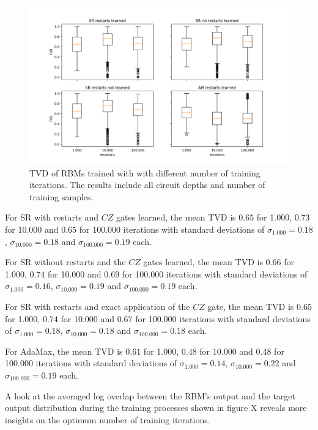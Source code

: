 \begin{figure}[H]
    \centering
    \includegraphics[width=\textwidth]{figures/iterations.png}
    \caption[Influence of Number of Training iterations.]{TVD of RBMs trained with 
    with different number of training iterations. The results include all circuit depths 
    and number of training samples.}
    \label{fig:iterations}
\end{figure}

For SR with restarts and $CZ$ gates learned, the mean TVD is $0.65$ for 1.000, $0.73$ for 10.000 and $0.65$ for 100.000 iterations 
with standard deviations of $\sigma_{1.000}=0.18$, $\sigma_{10.000}=0.18$ and $\sigma_{100.000}=0.19$
each. 

For SR without restarts and the $CZ$ gates learned, the mean TVD is $0.66$ for 1.000, $0.74$ for 10.000 and $0.69$ for 100.000 iterations 
with standard deviations of $\sigma_{1.000}=0.16$, $\sigma_{10.000}=0.19$ and $\sigma_{100.000}=0.19$
each. 

For SR with restarts and exact application of the $CZ$ gate, the mean TVD is $0.65$ for 1.000, $0.74$ for 10.000 and $0.67$ for 100.000 iterations 
with standard deviations of $\sigma_{1.000}=0.18$, $\sigma_{10.000}=0.18$ and $\sigma_{100.000}=0.18$
each. 

For AdaMax, the mean TVD is $0.61$ for 1.000, $0.48$ for 10.000 and $0.48$ for 100.000 iterations 
with standard deviations of $\sigma_{1.000}=0.14$, $\sigma_{10.000}=0.22$ and $\sigma_{100.000}=0.19$
each. 

A look at the averaged log overlap between the RBM's output and the target output distribution
during the training processes shown in figure X reveals more insights on the optimum number of training iterations.

